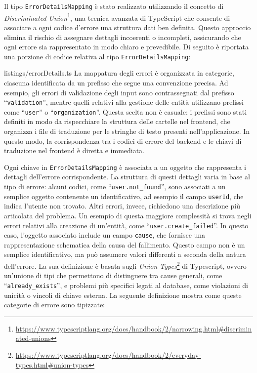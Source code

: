 Il tipo \texttt{ErrorDetailsMapping} è stato realizzato utilizzando il concetto di \textit{Discriminated Union}\footnote{\url{https://www.typescriptlang.org/docs/handbook/2/narrowing.html\#discriminated-unions}}, una tecnica avanzata di TypeScript che consente di associare a ogni codice d’errore una struttura dati ben definita. Questo approccio elimina il rischio di assegnare dettagli incoerenti o incompleti, assicurando che ogni errore sia rappresentato in modo chiaro e prevedibile.
%
Di seguito è riportata una porzione di codice relativa al tipo \texttt{ErrorDetailsMapping}:


{listings/errorDetails.ts}
%
La mappatura degli errori è organizzata in categorie, ciascuna identificata da un prefisso che segue una convenzione precisa. Ad esempio, gli errori di validazione degli input sono contrassegnati dal prefisso ``\texttt{validation}'', mentre quelli relativi alla gestione delle entità utilizzano prefissi come ``\texttt{user}'' o ``\texttt{organization}''. Questa scelta non è casuale: i prefissi sono stati definiti in modo da rispecchiare la struttura delle cartelle nel frontend, che organizza i file di traduzione per le stringhe di testo presenti nell’applicazione. In questo modo, la corrispondenza tra i codici di errore del backend e le chiavi di traduzione nel frontend è diretta e immediata.

Ogni chiave in \texttt{ErrorDetailsMapping} è associata a un oggetto che rappresenta i dettagli dell’errore corrispondente. La struttura di questi dettagli varia in base al tipo di errore: alcuni codici, come ``\texttt{user.not\_found}'', sono associati a un semplice oggetto contenente un identificativo, ad esempio il campo \texttt{userId}, che indica l’utente non trovato. Altri errori, invece, richiedono una descrizione più articolata del problema.
%
Un esempio di questa maggiore complessità si trova negli errori relativi alla creazione di un'entità, come ``\texttt{user.create\_failed}''. In questo caso, l’oggetto associato include un campo \texttt{cause}, che fornisce una rappresentazione schematica della causa del fallimento. Questo campo non è un semplice identificativo, ma può assumere valori differenti a seconda della natura dell’errore. La sua definizione è basata sugli \textit{Union Types}\footnote{\url{https://www.typescriptlang.org/docs/handbook/2/everyday-types.html\#union-types}} di Typescript, ovvero un’unione di tipi che permettono di distinguere tra cause generali, come ``\texttt{already\_exists}'', e problemi più specifici legati al database, come violazioni di unicità o vincoli di chiave esterna.
%
La seguente definizione mostra come queste categorie di errore sono tipizzate:

